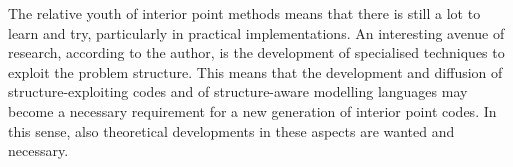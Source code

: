The relative youth of interior point methods means that there is still
a lot to learn and try, particularly in practical implementations.
An interesting avenue of research, according to the author, is the development
of specialised techniques to exploit the problem structure.
This means that the development and diffusion of structure-exploiting
codes and of structure-aware modelling languages may become a necessary
requirement for a new generation of interior point codes.
In this sense, also theoretical developments in these aspects are 
wanted and necessary.
